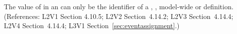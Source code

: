 The value of  in an \EventAssignment can only be the
identifier of a \Compartment, \Species, model-wide \Parameter or \SpeciesReference
definition.  (References: L2V1 Section 4.10.5; L2V2 Section~4.14.2;
L2V3 Section~4.14.4; L2V4 Section~4.14.4; L3V1 Section~\ref{sec:eventassignment}.)
